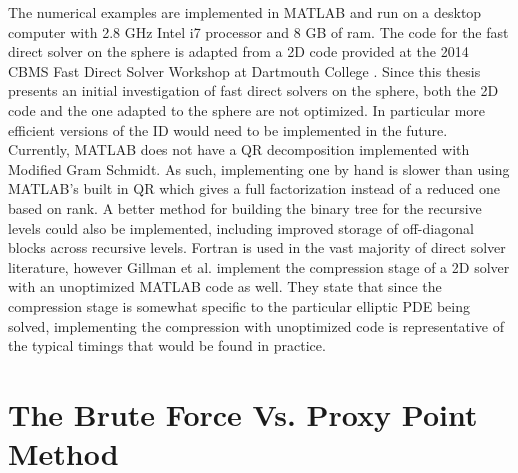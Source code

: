 \documentclass{sfuthesis}
\begin{document}
The numerical examples are implemented in MATLAB and run on a desktop computer with 2.8 GHz Intel i7 processor and 8 GB of ram. The code for the fast direct solver on the sphere is adapted from a 2D code provided at the 2014 CBMS Fast Direct Solver Workshop at Dartmouth College \cite{CBMScode}. Since this thesis presents an initial investigation of fast direct solvers on the sphere, both the 2D code and the one adapted to the sphere are not optimized. In particular more efficient versions of the ID would need to be implemented in the future. Currently, MATLAB does not have a QR decomposition implemented with Modified Gram Schmidt. As such, implementing one by hand is slower than using MATLAB's built in QR which gives a full factorization instead of a reduced one based on rank.  A better method for building the binary tree for the recursive levels could also be implemented, including improved storage of off-diagonal blocks across recursive levels. Fortran is used in the vast majority of direct solver literature, however Gillman et al. \cite{GillYoungMart2012} implement the compression stage of a 2D solver with an unoptimized MATLAB code as well. They state that since the compression stage is somewhat specific to the particular elliptic PDE being solved, implementing the compression with unoptimized code is representative of the typical timings that would be found in practice. 

\section{The Brute Force Vs. Proxy Point Method}
\end{document}
